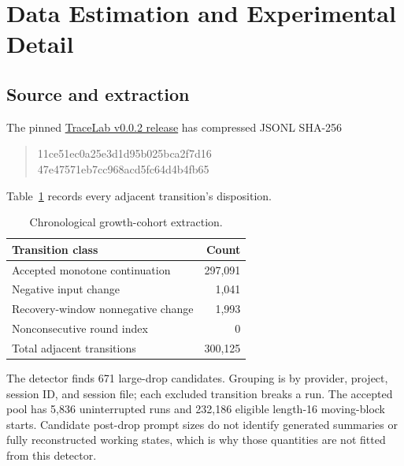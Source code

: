 \documentclass[sigconf,screen,nonacm]{acmart}
\begin{document}
\section{Data Estimation and Experimental Detail}
\label{app:data}

\subsection{Source and extraction}
The pinned
\href{https://github.com/uw-syfi/TraceLab/releases/tag/v0.0.2}{TraceLab v0.0.2 release}
has compressed JSONL SHA-256
\begin{quote}\ttfamily\footnotesize
11ce51ec0a25e3d1d95b025bca2f7d16\\
47e47571eb7cc968acd5fc64d4b4fb65
\end{quote}
Table~\ref{tab:selection} records every adjacent transition's disposition.

\begin{table}[ht]
\centering\small
\caption{Chronological growth-cohort extraction.}
\label{tab:selection}
\begin{tabular}{@{}lr@{}}\toprule
Transition class & Count\\\midrule
Accepted monotone continuation &297,091\\
Negative input change &1,041\\
Recovery-window nonnegative change &1,993\\
Nonconsecutive round index &0\\\midrule
Total adjacent transitions &300,125\\\bottomrule
\end{tabular}
\end{table}

The detector finds 671 large-drop candidates. Grouping is by provider,
project, session ID, and session file; each excluded transition breaks a
run. The accepted pool has 5,836 uninterrupted runs and 232,186 eligible
length-16 moving-block starts. Candidate post-drop prompt sizes do not
identify generated summaries or fully reconstructed working states, which
is why those quantities are not fitted from this detector.
\end{document}
